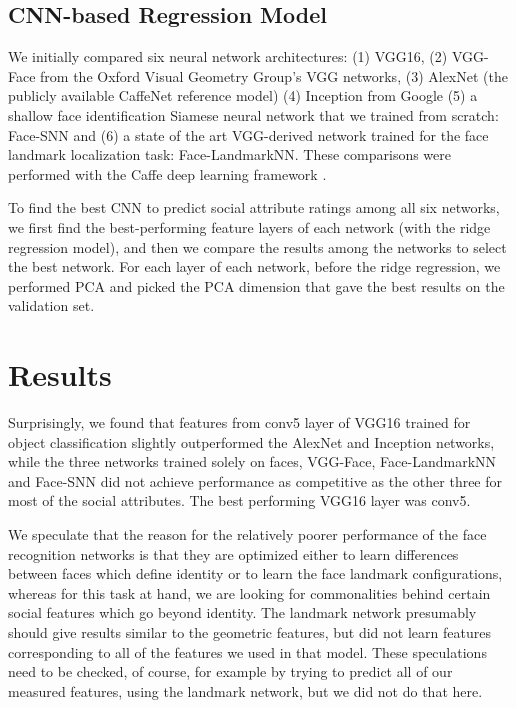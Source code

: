 \documentclass[10pt,twocolumn,letterpaper]{article}
\begin{document}
\subsection{CNN-based Regression Model}
We initially compared six neural network architectures: (1) VGG16, (2) VGG-Face from the Oxford Visual Geometry Group’s VGG networks\cite{simonyan2014very}, (3) AlexNet (the publicly available CaffeNet reference model) \cite{krizhevsky2012imagenet} (4) Inception from Google \cite{szegedy2015going} (5) a shallow face identification Siamese neural network that we trained from scratch: Face-SNN and (6) a state of the art VGG-derived network trained for the face landmark localization task: Face-LandmarkNN.  These comparisons were performed with the Caffe deep learning framework \cite{jia2014caffe}.

To find the best CNN to predict social attribute ratings among all six networks, we first find the best-performing feature layers of each network (with the ridge regression model), and then we compare the results among the networks to select the best network. For each layer of each network, before the ridge regression, we performed PCA and picked the PCA dimension that gave the best results on the validation set.

\section{Results} \label{result}
Surprisingly, we found that features from conv5 layer of VGG16 trained for object classification slightly outperformed the AlexNet and Inception networks, while the three networks trained solely on faces, VGG-Face, Face-LandmarkNN and Face-SNN did not achieve performance as competitive as the other three for most of the social attributes. The best performing VGG16 layer was conv5.

We speculate that the reason for the relatively poorer performance of the face recognition networks is that they are optimized either to learn differences between faces which define identity or to learn the face landmark configurations, whereas for this task at hand, we are looking for commonalities behind certain social features which go beyond identity. The landmark network presumably should give results similar to the geometric features, but did not learn features corresponding to all of the features we used in that model. These speculations need to be checked, of course, for example by trying to predict all of our measured features, using the landmark network, but we did not do that here.
\end{document}
